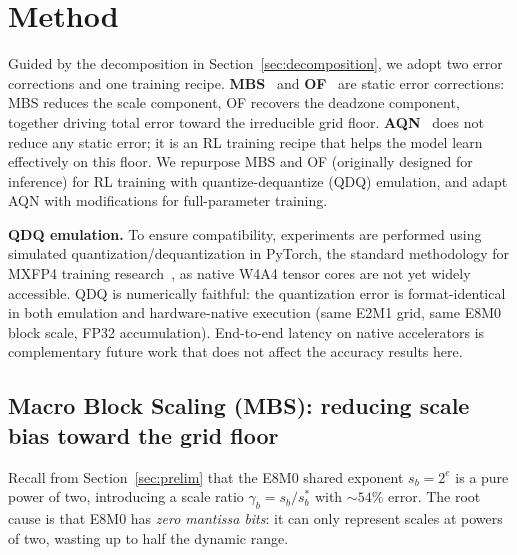 \documentclass{article}
\theoremstyle{definition}
\theoremstyle{remark}
\begin{document}
\section{Method}
\label{sec:method}

Guided by the decomposition in Section~\ref{sec:decomposition}, we adopt two error corrections and one training recipe. \textbf{MBS}~\citep{chhugani2026mxfp4} and \textbf{OF}~\citep{zhang2025fallback} are static error corrections: MBS reduces the scale component, OF recovers the deadzone component, together driving total error toward the irreducible grid floor. \textbf{AQN}~\citep{huang2025qerl} does not reduce any static error; it is an RL training recipe that helps the model learn effectively on this floor. We repurpose MBS and OF (originally designed for inference) for RL training with quantize-dequantize (QDQ) emulation, and adapt AQN with modifications for full-parameter training.

\textbf{QDQ emulation.}
To ensure compatibility, experiments are performed using simulated quantization/dequantization in PyTorch, the standard methodology for MXFP4 training research~\citep{tseng2025trainingllmsmxfp4,chen2025oscillation}, as native W4A4 tensor cores are not yet widely accessible. QDQ is numerically faithful: the quantization error is format-identical in both emulation and hardware-native execution (same E2M1 grid, same E8M0 block scale, FP32 accumulation). End-to-end latency on native accelerators is complementary future work that does not affect the accuracy results here.

\subsection{Macro Block Scaling (MBS): reducing scale bias toward the grid floor}
\label{sec:mbs}

Recall from Section~\ref{sec:prelim} that the E8M0 shared exponent $s_b = 2^e$ is a pure power of two, introducing a scale ratio $\gamma_b = s_b/s_b^*$ with ${\sim}54\%$ error. The root cause is that E8M0 has \emph{zero mantissa bits}: it can only represent scales at powers of two, wasting up to half the dynamic range.
\end{document}
